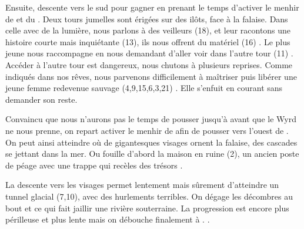 \documentclass[11pt]{article}
\begin{document}
Ensuite, descente vers le sud pour gagner \cornes{} en prenant le temps d'activer le menhir de \debacle{} et du \tumulus{}. Deux tours jumelles sont érigées sur des ilôts, face à la falaise. Dans celle avec de la lumière, nous parlons à des veilleurs (18), et leur racontons une histoire courte mais inquiétante (13), ils nous offrent du matériel (16) . Le plus jeune nous raccompagne en nous demandant d'aller voir dans l'autre tour (11) . Accéder à l'autre tour est dangereux, nous chutons à plusieurs reprises. Comme indiqués dans nos rêves, nous parvenons difficilement à maîtriser puis libérer une jeune femme redevenue sauvage (4,9,15,6,3,21) . Elle s'enfuit en courant sans demander son reste.

Convaincu que nous n'aurons pas le temps de pousser jusqu'à \larvebois{} avant que le Wyrd ne nous prenne, on repart activer le menhir de \bordwyrd{} afin de pousser vers l'ouest de \devastation{}. On peut ainsi atteindre \ondechute{} où de gigantesques visages ornent la falaise, des cascades se jettant dans la mer. Ou fouille d'abord la maison en ruine (2), un ancien poste de péage  avec une trappe qui recèles des trésors .

La descente vers les visages permet lentement mais sûrement d'atteindre un tunnel glacial (7,10), avec des hurlements terribles. On dégage les décombres au bout et  ce qui fait jaillir une rivière souterraine. La progression est encore plus périlleuse et plus lente mais  on débouche finalement à \tuathan{}. .


\printindex
\end{document}

